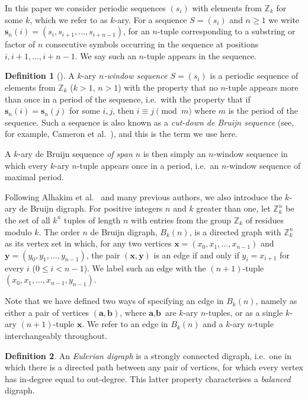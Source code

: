 \documentclass[a4paper,11pt]{article}
\theoremstyle{plain}
\theoremstyle{definition}
\newtheorem{definition}{Definition}[section]
\theoremstyle{remark}
\begin{document}
In this paper we consider periodic sequences $(s_i)$ with elements from $\mathbb{Z}_k$ for some
$k$, which we refer to as $k$-ary.  For a sequence $S = (s_i)$ and $n\geq1$ we write
$\mathbf{s}_n(i) = (s_i,s_{i+1},\ldots,s_{i+n-1})$, for an $n$-tuple corresponding to a substring
or factor of $n$ consecutive symbols occurring in the sequence at positions $i,i+1,\ldots,i+n-1$.
We say such an $n$-tuple appears in the sequence.

\begin{definition}[\cite{Alhakim24a}]
A $k$-ary \emph{$n$-window sequence $S = (s_i)$} is a periodic sequence of elements from
$\mathbb{Z}_k$ ($k>1$, $n>1$) with the property that no $n$-tuple appears more than once in a
period of the sequence, i.e.\ with the property that if $\mathbf{s}_n(i) = \mathbf{s}_n(j)$ for
some $i,j$, then $i \equiv j \pmod m$ where $m$ is the period of the sequence.  Such a sequence is
also known as a \emph{cut-down de Bruijn sequence} (see, for example, Cameron et al.\
\cite{Cameron25}), and this is the term we use here.
\end{definition}

A $k$-ary de Bruijn sequence \emph{of span $n$} is then simply an $n$-window sequence in which
every $k$-ary $n$-tuple appears once in a period, i.e.\ an $n$-window sequence of maximal period.

Following Alhakim et al.\ \cite{Alhakim24a} and many previous authors, we also introduce the
$k$-ary de Bruijn digraph. For positive integers $n$ and $k$ greater than one, let $\mathbb{Z}_k^n$
be the set of all $k^n$ tuples of length $n$ with entries from the group $\mathbb{Z}_k$ of residues
modulo $k$. The order $n$ de Bruijn digraph, $B_k(n)$, is a directed graph with $\mathbb{Z}^n_k$ as
its vertex set in which, for any two vertices $\textbf{x} = (x_0,x_1,\ldots,x_{n-1})$ and
$\textbf{y} = (y_0,y_1,\ldots,y_{n-1})$, the pair $(\textbf{x},\textbf{y})$ is an edge if and only
if $y_i = x_{i+1}$ for every $i$ ($0\leq i< n-1$). We label such an edge with the $(n+1)$-tuple
$(x_0,x_1,\ldots,x_{n-1},y_{n-1})$.

Note that we have defined two ways of specifying an edge in $B_k(n)$, namely as either a pair of
vertices $(\textbf{a},\textbf{b})$, where $\textbf{a},\textbf{b}$ are $k$-ary $n$-tuples, or as a
single $k$-ary $(n+1)$-tuple $\textbf{x}$.  We refer to an edge in $B_k(n)$ and a $k$-ary $n$-tuple
interchangeably throughout.

\begin{definition}  \label{definition:Eulerian} An \emph{Eulerian digraph} is a
strongly connected digraph, i.e.\ one in which there is a directed path between any pair of
vertices, for which every vertex has in-degree equal to out-degree.  This latter property
characterises a \emph{balanced} digraph.
\end{definition}
\end{document}
